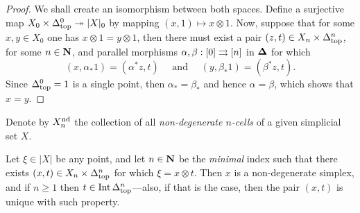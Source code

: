 \begin{proof}
We shall create an isomorphism between both spaces. Define a surjective map
\(X_0 \times \Delta_{\text{top}}^0 \twoheadrightarrow |X|_0\) by mapping \((x, 1) \mapsto x \otimes
1\). Now, suppose that for some \(x, y \in X_0\) one has
\(x \otimes 1 = y \otimes 1\), then there must exist a pair
\((z, t) \in X_n \times \Delta_{\text{top}}^n\), for some \(n \in \mathbf{N}\), and parallel
morphisms \(\alpha, \beta: [0] \rightrightarrows [n]\) in \({\mathbf{\Delta}}\) for which
\[
(x, \alpha_{*} 1) = (\alpha^{*} z, t)
\quad \text{ and } \quad
(y, \beta_{*} 1) = (\beta^{*} z, t).
\]
Since \(\Delta_{\text{top}}^0 = 1\) is a single point, then \(\alpha_{*} = \beta_{*}\) and
hence \(\alpha = \beta\), which shows that \(x = y\).
\end{proof}

\begin{notation}
\label{not:non-degenerate-cells}
Denote by \(X_n^{\operatorname{nd}}\) the collection of all \emph{non-degenerate
  \(n\)-cells} of a given simplicial set \(X\).
\end{notation}

\begin{lemma}
\label{lem:unique-non-degenerate-point-geometric-realization}
Let \(\xi \in |X|\) be any point, and let \(n \in \mathbf{N}\) be the \emph{minimal}
index such that there exists \((x, t) \in X_n \times \Delta_{\text{top}}^n\) for which
\(\xi = x \otimes t\). Then \(x\) is a non-degenerate simplex, and if
\(n \geq 1\) then \(t \in \operatorname{Int} \Delta_{\text{top}}^n\)---also, if that is the case, then the
pair \((x, t)\) is unique with such property.
\end{lemma}

